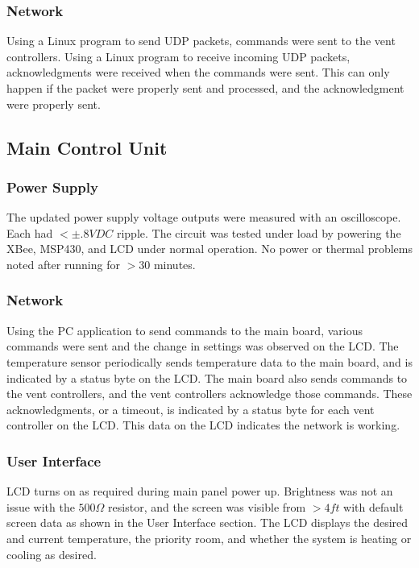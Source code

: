 \subsubsection{Network}
Using a Linux program to send UDP packets, commands were sent to the vent controllers.  Using a Linux program to receive incoming UDP packets, acknowledgments were received when the commands were sent.  This can only happen if the packet were properly sent and processed, and the acknowledgment were properly sent.

\subsection{Main Control Unit}

\subsubsection{Power Supply}
The updated power supply voltage outputs were measured with an oscilloscope.  Each had $<\pm .8VDC$ ripple.  The circuit was tested under load by powering the XBee, MSP430, and LCD under normal operation. No power or thermal problems noted after running for $>30$ minutes.

\subsubsection{Network}
Using the PC application to send commands to the main board, various commands were sent and the change in settings was observed on the LCD.  The temperature sensor periodically sends temperature data to the main board, and is indicated by a status byte on the LCD.  The main board also sends commands to the vent controllers, and the vent controllers acknowledge those commands.  These acknowledgments, or a timeout, is indicated by a status byte for each vent controller on the LCD.  This data on the LCD indicates the network is working. 

\subsubsection{User Interface}
LCD turns on as required during main panel power up.  Brightness was not an issue with the $500\Omega$ resistor, and the screen was visible from $>4ft$ with default screen data as shown in the User Interface section.  The LCD displays the desired and current temperature, the priority room, and whether the system is heating or cooling as desired.

